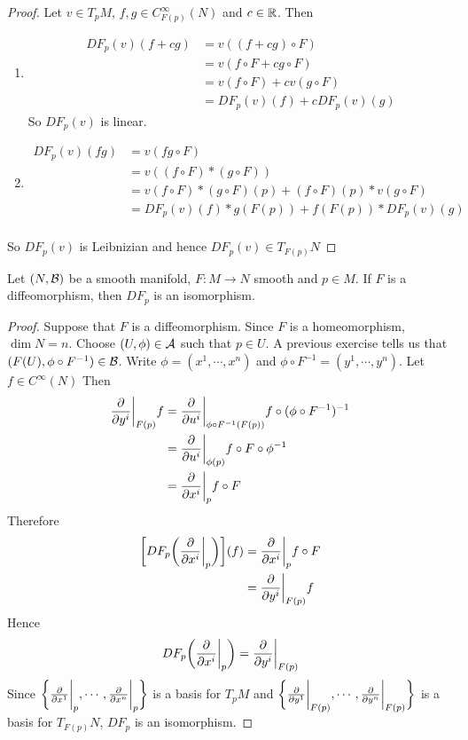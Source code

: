 \documentclass{book}
\begin{document}
	\begin{proof}
	Let $v \in T_pM$, $f,g \in C_{F(p)}^{\infty}(N)$ and $c \in \mathbb{R}$. Then 
	\begin{enumerate}
	\item 
	\begin{align*}
		DF_p(v)(f+cg) 
		&= v((f+cg) \circ F) \\
		&= v(f \circ F + c g \circ F) \\
		&= v(f \circ F) + cv(g \circ F) \\
		&= DF_p(v)(f) + c DF_p(v)(g)
	\end{align*}
	So $DF_p(v)$ is linear.
	\item 
	\begin{align*}
	DF_p(v)(fg) 
	&= v (fg \circ F) \\
	&= v((f \circ F)* (g \circ F)) \\
	&= v(f \circ F)*(g \circ F)(p) +  (f \circ F)(p)* v(g \circ F) \\
	&= DF_p(v)(f) * g(F(p)) + f(F(p))*DF_p(v)(g) \\
	\end{align*}
	\end{enumerate}
	So $DF_p(v)$ is Leibnizian and hence $DF_p(v) \in T_{F(p)}N$
	\end{proof}

	\begin{ex}
		Let $(N, \mathcal{B})$ be a smooth manifold, $F: M \rightarrow N$ smooth and $p \in M$. If $F$ is a diffeomorphism, then $DF_p$ is an isomorphism.
	\end{ex}
	
	\begin{proof}
		Suppose that $F$ is a diffeomorphism. Since $F$ is a homeomorphism, $\dim N = n$. Choose $(U, \phi) \in \mathcal{A}$ such that $p \in U$. A previous exercise tells us that $(F(U), \phi \circ F^{-1}) \in \mathcal{B}$. Write $\phi = (x^1, \cdots, x^n)$ and $\phi \circ F^{-1} = (y^1, \cdots, y^n)$. Let $f \in C^{\infty}(N)$ Then 
		\begin{align*}
			\frac{\partial}{\partial y^i} \bigg|_{F(p)} f
			&= 	\frac{\partial}{\partial u^i} \bigg|_{\phi \circ F^{-1} (F(p))} f \circ (\phi \circ F^{-1})^{-1} \\
			&= 	\frac{\partial}{\partial u^i} \bigg|_{\phi(p)} f \circ F \circ \phi^{-1} \\
			&= 	\frac{\partial}{\partial x^i} \bigg|_p f \circ F \\
		\end{align*}
		Therefore 
		\begin{align*}
			\bigg[ DF_p \bigg( \frac{\partial}{\partial x^i} \bigg|_p \bigg) \bigg] (f)
			&= \frac{\partial}{\partial x^i} \bigg|_p f \circ F \\
			&= \frac{\partial}{\partial y^i} \bigg|_{F(p)} f 
		\end{align*}
	Hence $$DF_p \bigg( \frac{\partial}{\partial x^i} \bigg|_p \bigg) = \frac{\partial}{\partial y^i} \bigg|_{F(p)}$$ 
	Since $\bigg \{\frac{\partial}{\partial x^1} \bigg|_p, \cdots, \frac{\partial}{\partial x^n} \bigg|_p \bigg \}$ is a basis for $T_pM$ and $\bigg \{\frac{\partial}{\partial y^1} \bigg|_{F(p)}, \cdots, \frac{\partial}{\partial y^n} \bigg|_{F(p)} \bigg \}$ is a basis for $T_{F(p)}N$, $DF_p$ is an isomorphism.
	\end{proof}
\end{document}
